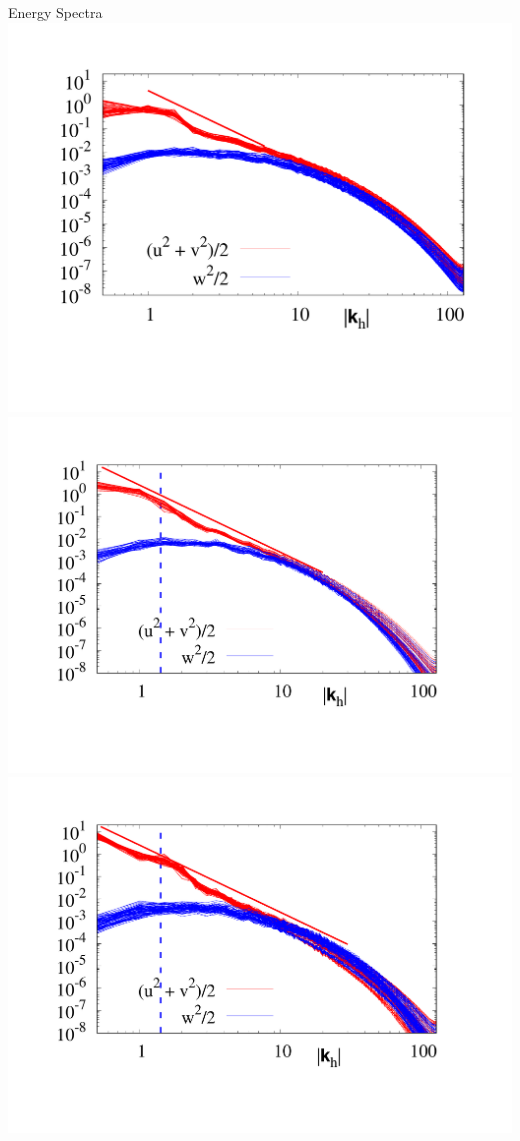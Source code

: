 \documentclass[30pt, blockverticalspace=1cm]{tikzposter}
\begin{document}
\begin{columns}
{\begin{center}
        \centering
        {\Large Energy Spectra}
    \emp
        \centering
        \includegraphics[width=.9\linewidth]{images/Om0.5Spec.pdf}
    \emp
        \centering
        \includegraphics[width=.9\linewidth]{images/Om2Spec.pdf}
    \emp
        \centering
        \includegraphics[width=.9\linewidth]{images/Om5Spec.pdf}
    \emp
    \end{center}
}


\end{columns}
\end{document}
